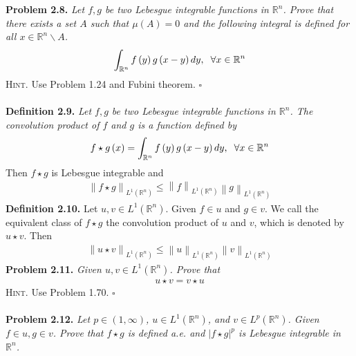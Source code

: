 \documentclass[a4paper]{article}
\numberwithin{equation}{section}
\begin{document}
\textbf{Problem 2.8.} \textit{Let $f,g$ be two Lebesgue integrable functions in $\mathbb{R}^n$. Prove that there exists a set $A$ such that $\mu \left(A\right)=0$ and the following integral is defined for all $x \in \mathbb{R}^n\backslash A$.}
\begin{align}
\int_{{\mathbb{R}^n}} {f\left( y \right)g\left( {x - y} \right)dy} ,\hspace{0.2cm}\forall x \in {\mathbb{R}^n}
\end{align}
\textsc{Hint.} Use Problem 1.24 and Fubini theorem. \hfill $\square$\\
\\
\textbf{Definition 2.9.} \textit{Let $f,g$ be two Lebesgue integrable functions in $\mathbb{R}^n$. The convolution product of $f$ and $g$ is a function defined by}
\begin{align}
f\star g\left( x \right) = \int_{{\mathbb{R}^n}} {f\left( y \right)g\left( {x - y} \right)dy} ,\hspace{0.2cm}\forall x \in {\mathbb{R}^n}
\end{align}
Then $f\star g$ is Lebesgue integrable and
\begin{align}
{\left\| {f\star g} \right\|_{{L^1}\left( {{\mathbb{R}^n}} \right)}} \le {\left\| f \right\|_{{L^1}\left( {{\mathbb{R}^n}} \right)}}{\left\| g \right\|_{{L^1}\left( {{\mathbb{R}^n}} \right)}}
\end{align}
\textbf{Definition 2.10.} Let $u,v\in L^1\left(\mathbb{R}^n\right)$. Given $f\in u$ and $g\in v$. We call the equivalent class of $f\star g$ the convolution product of $u$ and $v$, which is denoted by $u\star v$. Then 
\begin{align}
{\left\| {u\star v} \right\|_{{L^1}\left( {{\mathbb{R}^n}} \right)}} \le {\left\| u \right\|_{{L^1}\left( {{\mathbb{R}^n}} \right)}}{\left\| v \right\|_{{L^1}\left( {{\mathbb{R}^n}} \right)}}
\end{align}
\textbf{Problem 2.11.} \textit{Given $u,v\in L^1\left(\mathbb{R}^n\right)$. Prove that}
\begin{align}
u\star v=v\star u
\end{align}
\textsc{Hint.} Use Problem 1.70. \hfill $\square$\\
\\
\textbf{Problem 2.12.} \textit{Let $p\in \left(1,\infty\right)$, $u\in L^1\left(\mathbb{R}^n\right)$, and $v\in L^p\left(\mathbb{R}^n\right)$. Given $f\in u, g\in v$. Prove that $f\star g$ is defined a.e. and ${\left| {f\star g} \right|^p}$ is Lebesgue integrable in $\mathbb{R}^n$.}\\
\end{document}
